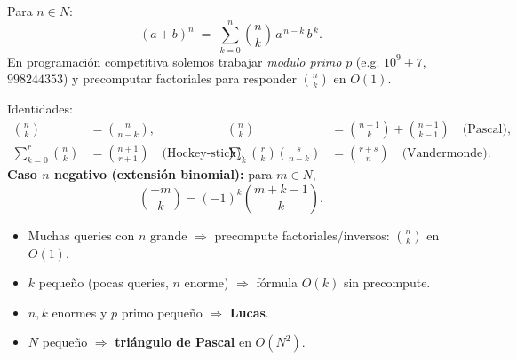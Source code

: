 Para $n \in N$:
\[
(a+b)^n \;=\; \sum_{k=0}^{n} \binom{n}{k}\, a^{\,n-k}\, b^{\,k}.
\]
En programación competitiva solemos trabajar \emph{modulo primo} $p$ (e.g. $10^9{+}7$, $998244353$) y precomputar factoriales para responder $\binom{n}{k}$ en $O(1)$.

Identidades:\\
\begin{align*}
\binom{n}{k} &= \binom{n}{n-k}, &
\binom{n}{k} &= \binom{n-1}{k} + \binom{n-1}{k-1} \quad\text{(Pascal)},\\
\sum_{k=0}^{r} \binom{n}{k} &= \binom{n+1}{r+1} \quad\text{(Hockey-stick)},&
\sum_{k} \binom{r}{k}\binom{s}{n-k} &= \binom{r+s}{n} \quad\text{(Vandermonde)}.
\end{align*}
\textbf{Caso $n$ negativo (extensión binomial):} para $m\in N$,
\[
\binom{-m}{k} = (-1)^k \binom{m+k-1}{k}.
\]

\begin{itemize}
  \item Muchas queries con $n$ grande \;$\Rightarrow$ precompute factoriales/inversos: $\binom{n}{k}$ en $O(1)$.
  \item $k$ pequeño (pocas queries, $n$ enorme) \;$\Rightarrow$ fórmula $O(k)$ sin precompute.
  \item $n,k$ enormes y $p$ primo pequeño \;$\Rightarrow$ \textbf{Lucas}.
  \item $N$ pequeño \;$\Rightarrow$ \textbf{triángulo de Pascal} en $O(N^2)$.
\end{itemize}
